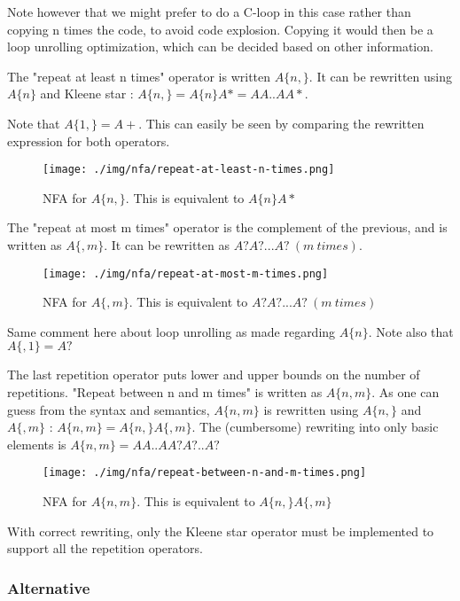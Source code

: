 \documentclass[11pt,a4paper]{report}
\newcommand{\regexp}[1]{$#1$}
\begin{document}
Note however that we might prefer to do a C-loop in this case rather than copying n times the code, to avoid code explosion. Copying it would then be a loop unrolling optimization, which can be decided based on other information.

The "repeat at least n times" operator is written \regexp{A\{n,\}}. It can be rewritten using \regexp{A\{n\}} and Kleene star : \regexp{A\{n,\} = A\{n\}A* = AA..AA*}.

Note that \regexp{A\{1,\} = A+}. This can easily be seen by comparing the rewritten expression for both operators.

\begin{figure}[h!]
	\centering
	\texttt{[image: ./img/nfa/repeat-at-least-n-times.png]}
	\caption{NFA for \regexp{A\{n,\}}. This is equivalent to \regexp{A\{n\}A*}}
\end{figure}

The "repeat at most m times" operator is the complement of the previous, and is written as \regexp{A\{,m\}}. It can be rewritten as \regexp{A?A?...A?\ (m\ times)}.

\begin{figure}[h!]
	\centering
	\texttt{[image: ./img/nfa/repeat-at-most-m-times.png]}
	\caption{NFA for \regexp{A\{,m\}}. This is equivalent to \regexp{A?A?...A?\ (m\ times)}}
\end{figure}

Same comment here about loop unrolling as made regarding \regexp{A\{n\}}. Note also that \regexp{A\{,1\} = A?}

The last repetition operator puts lower and upper bounds on the number of repetitions. "Repeat between n and m times" is written as \regexp{A\{n, m\}}. As one can guess from the syntax and semantics, \regexp{A\{n, m\}} is rewritten using \regexp{A\{n, \}} and \regexp{A\{, m\}} : \regexp{A\{n, m\} = A\{n, \}A\{, m\}}. The (cumbersome) rewriting into only basic elements is \regexp{A\{n, m\} = AA..AA?A?..A?}

\begin{figure}[h!]
	\centering
	\texttt{[image: ./img/nfa/repeat-between-n-and-m-times.png]}
	\caption{NFA for \regexp{A\{n,m\}}. This is equivalent to \regexp{A\{n,\}A\{,m\}}}
\end{figure}

With correct rewriting, only the Kleene star operator must be implemented to support all the repetition operators.

\subsubsection{Alternative}
\end{document}
